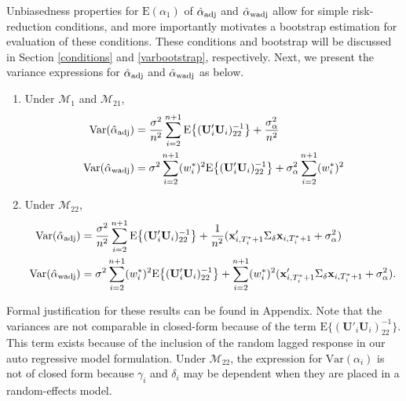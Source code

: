 \documentclass[11pt]{article}
\def\mbf#1{\mathbf{#1}} %
\def\mrm#1{\mathrm{#1}} %
\def\mc#1{\mathcal{#1}} %
\def\E#1{\mathrm{E}(#1)} %
\def\var#1{\mathrm{Var}(#1)} %
\theoremstyle{definition}
\begin{document}
Unbiasedness properties for $\E{\alpha_1}$ of $\hat{\alpha}_{\rm adj}$ and $\hat{\alpha}_{\rm wadj}$ allow for simple risk-reduction conditions, and more importantly motivates a bootstrap estimation for evaluation of these conditions. %
These conditions and bootstrap will be discussed in Section \ref{conditions} and \ref{varbootstrap}, respectively. Next, we present the variance expressions for $\hat{\alpha}_{\rm adj}$ and $\hat{\alpha}_{\rm wadj}$ as below.

\begin{enumerate}[label = (\roman*)]
  \item Under $\mc{M}_1$ and $\mc{M}_{21}$,  
\begin{align*}
  \var{\hat{\alpha}_{\rm adj}} 
  &=\frac{\sigma^2}{n^2}\sum_{i=2}^{n+1}\mrm{E}\big\{(\mbf{U}'_i\mbf{U}_i)^{-1}_{22}\big\}+\frac{\sigma^2_{\alpha}}{n^2}\\
\var{\hat{\alpha}_{\rm wadj}}  &= \sigma^2\sum_{i=2}^{n+1}(w_i^*)^2\mrm{E}\big\{(\mbf{U}'_i\mbf{U}_i)^{-1}_{22}\big\}+\sigma^2_{\alpha}\sum_{i=2}^{n+1}(w_i^*)^2
\end{align*}
\item Under $\mc{M}_{22}$, 
\begin{align*}
\var{\hat{\alpha}_{\rm adj}} 
  &=\frac{\sigma^2}{n^2}\sum_{i=2}^{n+1}\mrm{E}\big\{(\mbf{U}'_i\mbf{U}_i)^{-1}_{22}\big\}+\frac{1}{n^2}(\mbf{x}_{i, T_i^*+1}'\Sigma_{\delta}\mbf{x}_{i, T_i^*+1} + \sigma^2_{\alpha})\\
  \var{\hat{\alpha}_{\rm wadj}} 
  &= \sigma^2\sum_{i=2}^{n+1}(w_i^*)^2\mrm{E}\big\{(\mbf{U}'_i\mbf{U}_i)^{-1}_{22}\big\}
  + \sum_{i=2}^{n+1} (w_i^*)^2 (\mbf{x}_{i, T_i^*+1}'\Sigma_{\delta}\mbf{x}_{i, T_i^*+1} + \sigma^2_{\alpha}).
\end{align*}
\end{enumerate}
Formal justification for these results can be found in Appendix. Note that the variances are not comparable in closed-form %
because of the term $\mrm{E}\big\{(\mbf{U}'_i\mbf{U}_i)^{-1}_{22}\big\}$.  This term exists because of the inclusion of the random lagged response in our auto regressive model formulation.  Under $\mc{M}_{22}$, the expression for $\var{\alpha_i}$ is not of closed form because $\gamma_i$ and $\delta_i$ may be dependent when they are placed in a random-effects model.  
\end{document}
